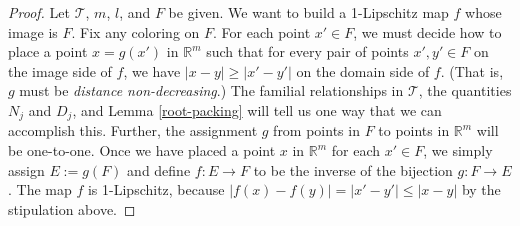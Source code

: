 \documentclass[12pt]{amsart}
\theoremstyle{definition}
\theoremstyle{remark}
\newcommand{\RR}{\mathbb{R}}
\numberwithin{figure}{section}
\numberwithin{equation}{section}
\begin{document}
\begin{proof} Let $\mathcal{T}$, $m$, $l$, and $F$ be given. We want to build a 1-Lipschitz map $f$ whose image is $F$. Fix any coloring on $F$. For each point $x'\in F$, we must decide how to place a point $x=g(x')$ in $\RR^m$ such that for every pair of points $x',y'\in F$ on the image side of $f$, we have $|x-y|\geq |x'-y'|$ on the domain side of $f$. (That is, $g$ must be \emph{distance non-decreasing}.) The familial relationships in $\mathcal{T}$, the quantities $N_j$ and $D_j$, and Lemma \ref{root-packing} will tell us one way that we can accomplish this. Further, the assignment $g$ from points in $F$ to points in $\RR^m$ will be one-to-one. Once we have placed a point $x$ in $\RR^m$ for each $x'\in F$, we simply assign $E:=g(F)$ and define $f:E\rightarrow F$ to be the inverse of the bijection $g:F\rightarrow E$. The map $f$ is 1-Lipschitz, because $|f(x)-f(y)|=|x'-y'|\leq |x-y|$ by the stipulation above.


\end{proof}
\end{document}
